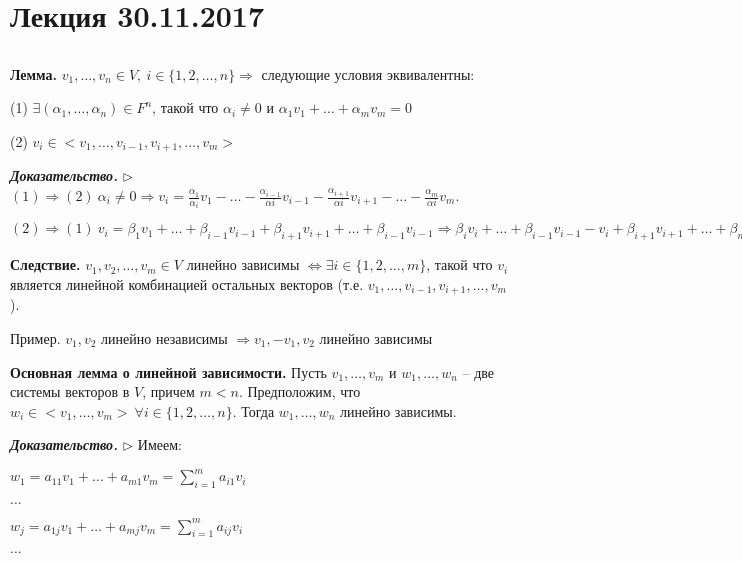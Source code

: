 \section{Лекция 30.11.2017}

\subsection{}

\bigskip
\textbf{Лемма.} $v_1, \dots, v_n \in V, \ i \in \{1, 2, \dots, n\} \Rightarrow$ следующие условия эквивалентны:

(1) $\exists (\alpha_1, \dots, \alpha_n) \in F^n$, такой что $\alpha_i \neq 0$ и $\alpha_1 v_1 + \dots + \alpha_m v_m = 0$

(2) $v_i \in <v_1, \dots, v_{i-1}, v_{i + 1}, \dots , v_m>$

\bigskip
\textbf{\textit{Доказательство.}} $\rhd$ $(1) \Rightarrow (2) \ \alpha_i \neq 0 \Rightarrow v_i = \frac{\alpha_1}{\alpha_i} v_1 - \dots - \frac{\alpha_{i-1}}{\alpha{i}} v_{i - 1} - \frac{\alpha_{i+1}}{\alpha{i}} v_{i + 1} - \dots - \frac{\alpha_{m}}{\alpha{i}} v_m$.

$(2) \Rightarrow (1) \ v_i = \beta_1 v_1 + \dots + \beta_{i - 1} v_{i - 1} + \beta_{i + 1} v_{i + 1} + \dots + \beta_{i - 1} v_{i - 1} \Rightarrow \beta_i v_i + \dots + \beta_{i-1} v_{i-1} - v_i + \beta_{i+1} v_{i+1} + \dots + \beta_{m} v_{m} = 0 \ \lhd$

\bigskip
\textbf{Следствие.} $v_1, v_2, \dots, v_m \in V$ линейно зависимы $\Leftrightarrow \exists i \in \{1, 2, \dots, m\}$, такой что $v_i$ является линейной комбинацией остальных векторов (т.е. $v_1, \dots, v_{i-1}, v_{i+1}, \dots, v_m$).

\bigskip
Пример. $v_1, v_2$ линейно независимы $\Rightarrow v_1, -v_1, v_2$ линейно зависимы

\bigskip
\textbf{Основная лемма о линейной зависимости.} Пусть $v_1, \dots, v_m$ и $w_1, \dots, w_n$ -- две системы векторов в $V$, причем $m < n$. Предположим, что $w_i \in <v_1, \dots, v_m> \ \forall i \in \{1, 2, \dots, n\}$. Тогда $w_1, \dots, w_n$ линейно зависимы.

\bigskip
\textbf{\textit{Доказательство.}} $\rhd$ Имеем:

$w_1 = a_{11}v_1 + \dots + a_{m1} v_m = \sum\limits_{i = 1}^m a_{i1} v_i$

$\dots$

$w_j = a_{1j}v_1 + \dots + a_{mj} v_m = \sum\limits_{i = 1}^m a_{ij} v_i$

$\dots$

